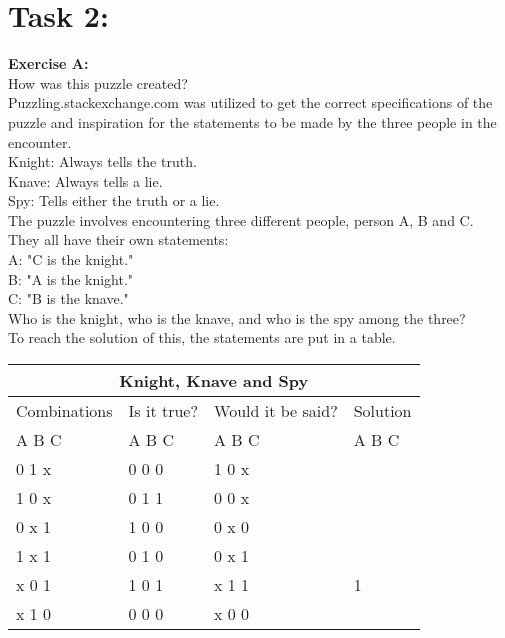 \documentclass[11pt]{amsart}
\begin{document}
\section{Task 2:}

\textbf{Exercise A:}\\

How was this puzzle created? \\
	Puzzling.stackexchange.com was utilized to get the correct specifications of the puzzle
	and inspiration for the statements to be made by the three people in the encounter. \\

Knight: Always tells the truth.\\
Knave: 	Always tells a lie.\\
Spy: 		Tells either the truth or a lie. \\

The puzzle involves encountering three different people, person A, B and C. \\

They all have their own statements: \\

	A: "C is the knight."\\
	B: "A is the knight."\\
	C: "B is the knave." \\

Who is the knight, who is the knave, and who is the spy among the three? \\

To reach the solution of this, the statements are put in a table. \\
\begin{tabular}{ |p{3cm}||p{3cm}|p{3cm}|p{3cm}|  }
 \hline
 \multicolumn{4}{|c|}{Knight, Knave and Spy} \\
 \hline
 Combinations & Is it true? & Would it be said? & Solution  \\ A  B  C   &   A  B  C  &   A  B  C & A  B  C \\
 \hline
	0   1   x  	& 0	0	0   & 1 0 x &  \\
	1   0   x		& 0	1	1  	& 0 0 x &  \\
	0   x   1 	&	1	0	0 	& 0 x 0 &  \\
	1   x   1  	&	0	1	0 	& 0 x 1 &  \\
	x   0   1		& 1	0	1  	& x 1 1 & 1\\
	x   1   0		& 0	0	0  	& x 0 0 &  \\
 \hline
\end{tabular}
\end{document}
